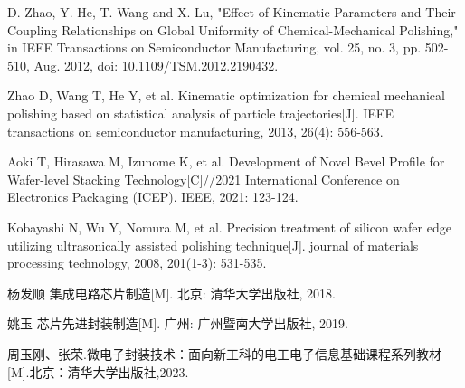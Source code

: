 \documentclass[11pt]{article}
\begin{document}
\newpage
\begin{thebibliography}{99}
    \item D. Zhao, Y. He, T. Wang and X. Lu, "Effect of Kinematic Parameters and Their Coupling Relationships on Global Uniformity of Chemical-Mechanical Polishing," in IEEE Transactions on Semiconductor Manufacturing, vol. 25, no. 3, pp. 502-510, Aug. 2012, doi: 10.1109/TSM.2012.2190432.
    \item Zhao D, Wang T, He Y, et al. Kinematic optimization for chemical mechanical polishing based on statistical analysis of particle trajectories[J]. IEEE transactions on semiconductor manufacturing, 2013, 26(4): 556-563.
    \item Aoki T, Hirasawa M, Izunome K, et al. Development of Novel Bevel Profile for Wafer-level Stacking Technology[C]//2021 International Conference on Electronics Packaging (ICEP). IEEE, 2021: 123-124.
    \item Kobayashi N, Wu Y, Nomura M, et al. Precision treatment of silicon wafer edge utilizing ultrasonically assisted polishing technique[J]. journal of materials processing technology, 2008, 201(1-3): 531-535.
    \item  杨发顺 集成电路芯片制造[M]. 北京: 清华大学出版社, 2018. 
    \item  姚玉 芯片先进封装制造[M]. 广州: 广州暨南大学出版社, 2019. 
    \item 周玉刚、张荣.微电子封装技术：面向新工科的电工电子信息基础课程系列教材[M].北京：清华大学出版社,2023.
\end{thebibliography}
\end{document}
